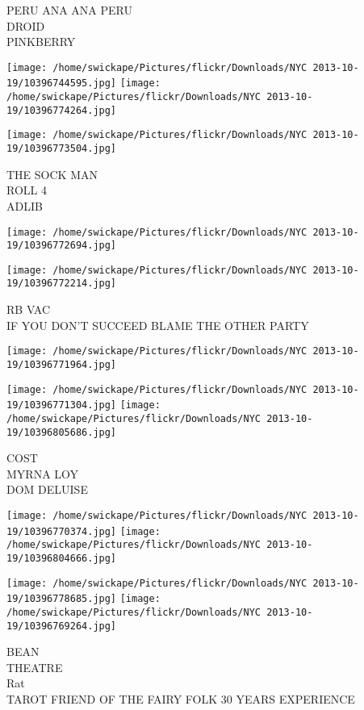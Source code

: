 \documentclass[10pt,letterpaper]{article}
\begin{document}
PERU ANA ANA PERU\\
DROID\\
PINKBERRY\\
\pagebreak

\texttt{[image: /home/swickape/Pictures/flickr/Downloads/NYC 2013-10-19/10396744595.jpg]}
\texttt{[image: /home/swickape/Pictures/flickr/Downloads/NYC 2013-10-19/10396774264.jpg]}

\texttt{[image: /home/swickape/Pictures/flickr/Downloads/NYC 2013-10-19/10396773504.jpg]}

THE SOCK MAN\\
ROLL 4\\
ADLIB\\
\pagebreak

\texttt{[image: /home/swickape/Pictures/flickr/Downloads/NYC 2013-10-19/10396772694.jpg]}

\vspace{0.25in}
\texttt{[image: /home/swickape/Pictures/flickr/Downloads/NYC 2013-10-19/10396772214.jpg]}

RB VAC\\
IF YOU DON'T SUCCEED BLAME THE OTHER PARTY\\
\pagebreak

\texttt{[image: /home/swickape/Pictures/flickr/Downloads/NYC 2013-10-19/10396771964.jpg]}

\vspace{0.25in}
\texttt{[image: /home/swickape/Pictures/flickr/Downloads/NYC 2013-10-19/10396771304.jpg]}
\texttt{[image: /home/swickape/Pictures/flickr/Downloads/NYC 2013-10-19/10396805686.jpg]}

COST\\
MYRNA LOY\\
DOM DELUISE\\
\pagebreak

\texttt{[image: /home/swickape/Pictures/flickr/Downloads/NYC 2013-10-19/10396770374.jpg]}
\texttt{[image: /home/swickape/Pictures/flickr/Downloads/NYC 2013-10-19/10396804666.jpg]}

\texttt{[image: /home/swickape/Pictures/flickr/Downloads/NYC 2013-10-19/10396778685.jpg]}
\texttt{[image: /home/swickape/Pictures/flickr/Downloads/NYC 2013-10-19/10396769264.jpg]}

BEAN\\
THEATRE\\
Rat\\
TAROT FRIEND OF THE FAIRY FOLK 30 YEARS EXPERIENCE\\
\pagebreak
\end{document}
